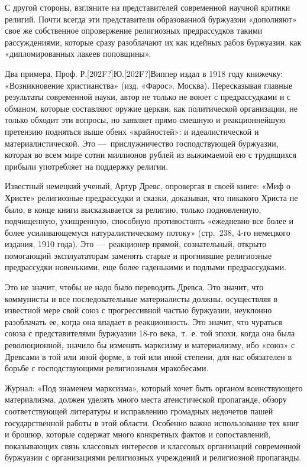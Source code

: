 С другой стороны, взгляните на представителей современной научной критики
религий. Почти всегда эти представители образованной буржуазии «дополняют»
свое же собственное опровержение религиозных предрассудков такими
рассуждениями, которые сразу разоблачают их как идейных рабов буржуазии,
как «дипломированных лакеев поповщины».

Два примера. Проф. Р.\textlatin{[202F?]}Ю.\textlatin{[202F?]}Виппер издал в
1918 году книжечку: «Возникновение христианства» (изд. «Фарос». Москва).
Пересказывая главные результаты современной науки, автор не только не воюет
с предрассудками и с обманом, которые составляют оружие церкви, как
политической организации, не только обходит эти вопросы, но заявляет прямо
смешную и реакционнейшую претензию подняться выше обеих «крайностей»: и
идеалистической и материалистической. Это —~прислужничество господствующей
буржуазии, которая во всем мире сотни миллионов рублей из выжимаемой ею с
трудящихся прибыли употребляет на поддержку религии.

Известный немецкий ученый, Артур Древс, опровергая в своей книге: «Миф о
Христе» религиозные предрассудки и сказки, доказывая, что никакого Христа
не было, в конце книги высказывается за религию, только подновленную,
подчищенную, ухищренную, способную противостоять «ежедневно все более и
более усиливающемуся натуралистическому потоку» (стр.~238, 4-го немецкого
издания, 1910 года). Это —~реакционер прямой, сознательный, открыто
помогающий эксплуататорам заменять старые и прогнившие религиозные
предрассудки новенькими, еще более гаденькими и подлыми предрассудками.

Это не значит, чтобы не надо было переводить Древса. Это значит, что
коммунисты и все последовательные материалисты должны, осуществляя в
известной мере свой союз с прогрессивной частью буржуазии, неуклонно
разоблачать ее, когда она впадает в реакционность. Это значит, что чураться
союза с представителями буржуазии 18-го века,~т.~е. той эпохи, когда она
была революционной, значило бы изменять марксизму и материализму, ибо
«союз» с Древсами в той или иной форме, в той или иной степени, для нас
обязателен в борьбе с господствующими религиозными мракобесами.

Журнал: «Под знаменем марксизма», который хочет быть органом воинствующего
материализма, должен уделять много места атеистической пропаганде, обзору
соответствующей литературы и исправлению громадных недочетов пашей
государственной работы в этой области. Особенно важно использование тех
книг и брошюр, которые содержат много конкретных фактов и сопоставлений,
показывающих связь классовых интересов и классовых организаций современной
буржуазии с организациями религиозных учреждений и религиозной пропаганды.

